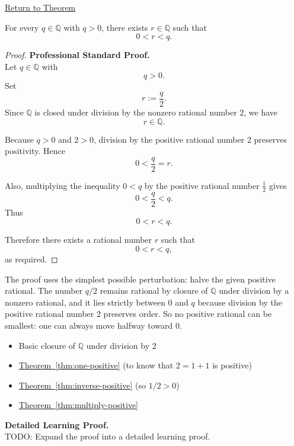 \newpage
{}
\label{prf:q-has-no-minimum-positive-element}

\begin{remark*}[Return]
\hyperref[thm:q-has-no-minimum-positive-element]{Return to Theorem}
\end{remark*}

\begin{theorem*}
For every $q\in\mathbb{Q}$ with $q>0$, there exists $r\in\mathbb{Q}$ such that
\[
0<r<q.
\]
\end{theorem*}

\begin{proof}
\textbf{Professional Standard Proof.}~\\
Let $q\in\mathbb{Q}$ with
\[
q>0.
\]
Set
\[
r:=\frac{q}{2}.
\]
Since $\mathbb{Q}$ is closed under division by the nonzero rational number
$2$, we have
\[
r\in\mathbb{Q}.
\]

Because $q>0$ and $2>0$, division by the positive rational number $2$
preserves positivity.  Hence
\[
0<\frac{q}{2}=r.
\]

Also, multiplying the inequality $0<q$ by the positive rational number
$\frac{1}{2}$ gives
\[
0<\frac{q}{2}<q.
\]
Thus
\[
0<r<q.
\]

Therefore there exists a rational number $r$ such that
\[
0<r<q,
\]
as required.
\end{proof}

\begin{remark*}
The proof uses the simplest possible perturbation: halve the given positive
rational.  The number $q/2$ remains rational by closure of $\mathbb{Q}$ under
division by a nonzero rational, and it lies strictly between $0$ and $q$
because division by the positive rational number $2$ preserves order.  So no
positive rational can be smallest: one can always move halfway toward $0$.
\end{remark*}

\begin{dependencies}
\begin{itemize}
  \item Basic closure of $\mathbb{Q}$ under division by $2$
  \item \hyperref[thm:one-positive]{Theorem~\ref*{thm:one-positive}}
        \textnormal{(to know that $2=1+1$ is positive)}
  \item \hyperref[thm:inverse-positive]{Theorem~\ref*{thm:inverse-positive}}
        \textnormal{(so $1/2>0$)}
  \item \hyperref[thm:multiply-positive]{Theorem~\ref*{thm:multiply-positive}}
\end{itemize}
\end{dependencies}

\textbf{Detailed Learning Proof.}~\\
TODO: Expand the proof into a detailed learning proof.

